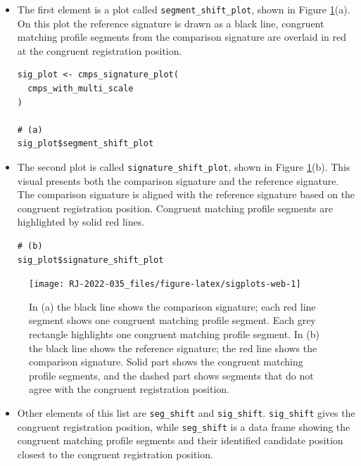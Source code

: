 \begin{itemize}
\item
  The first element is a plot called \texttt{segment\_shift\_plot}, shown in Figure \ref{fig:sigplots-web}(a). On this plot the reference signature is drawn as a black line, congruent matching profile segments from the comparison signature are overlaid in red at the congruent registration position.

\begin{verbatim}
sig_plot <- cmps_signature_plot(
  cmps_with_multi_scale
)

# (a)
sig_plot$segment_shift_plot
\end{verbatim}
\item
  The second plot is called \texttt{signature\_shift\_plot}, shown in Figure \ref{fig:sigplots-web}(b). This visual presents both the comparison signature and the reference signature. The comparison signature is aligned with the reference signature based on the congruent registration position. Congruent matching profile segments are highlighted by solid red lines.

\begin{verbatim}
# (b)
sig_plot$signature_shift_plot
\end{verbatim}
\end{itemize}

\begin{figure}

{\centering \texttt{[image: RJ-2022-035\_files/figure-latex/sigplots-web-1]} 

}

\caption{In (a) the black line shows the comparison signature; each red line segment shows one congruent matching profile segment. Each grey rectangle highlights one congruent matching profile segment. In (b) the black line shows the reference signature; the red line shows the comparison signature. Solid part shows the congruent matching profile segments, and the dashed part shows segments that do not agree with the congruent registration position.}\label{fig:sigplots-web}
\end{figure}

\begin{itemize}
\tightlist
\item
  Other elements of this list are \texttt{seg\_shift} and \texttt{sig\_shift}. \texttt{sig\_shift} gives the congruent registration position, while \texttt{seg\_shift} is a data frame showing the congruent matching profile segments and their identified candidate position closest to the congruent registration position.
\end{itemize}

